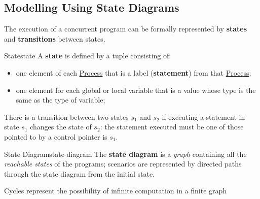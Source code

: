 \subsection{Modelling Using State Diagrams}\label{sub:cp_modelling_using_state_diagrams} %
The execution of a concurrent program can be formally represented by \textbf{states} and \textbf{transitions} between states.
\begin{definition}{State}{state}
    A \textbf{state} is defined by a tuple consisting of:
    \begin{itemize}
        \item one element of each \hyperref[def:process]{Process} that is a label (\textbf{statement}) from that \hyperref[def:process]{Process};
        \item one element for each global or local variable that is a value whose type is the same as the type of variable;
    \end{itemize}
    There is a transition between two states $s_1$ and $s_2$ if executing a statement in state $s_1$ changes the state of $s_2$: the statement executed must be one of those pointed to by a control pointer is $s_1$.
\end{definition}
\begin{definition}{State Diagram}{state-diagram}
    The \textbf{state diagram} is a \textit{graph} containing all the \textit{reachable states} of the programs; scenarios are represented by directed paths through the state diagram from the initial state.
    \begin{note}
        Cycles represent the possibility of infinite computation in a finite graph
    \end{note}
\end{definition}
